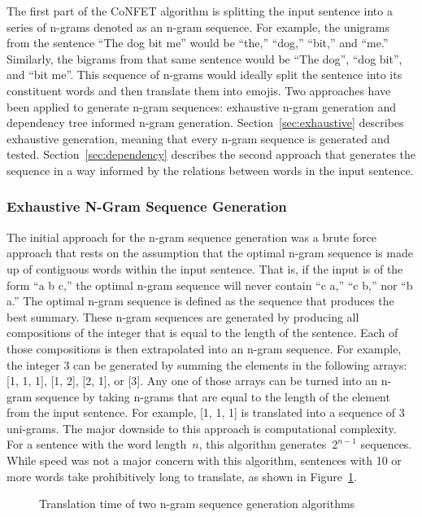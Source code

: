 \documentclass{article}[10]
\begin{document}
The first part of the CoNFET algorithm is splitting the input sentence into a series of n-grams denoted as an n-gram sequence. For example, the unigrams from the sentence ``The dog bit me'' would be ``the,'' ``dog,'' ``bit,'' and ``me.'' Similarly, the bigrams from that same sentence would be ``The dog'', ``dog bit'', and ``bit me''. This sequence of n-grams would ideally split the sentence into its constituent words and then translate them into emojis. Two approaches have been applied to generate n-gram sequences: exhaustive n-gram generation and dependency tree informed n-gram generation. Section~\ref{sec:exhaustive} describes exhaustive generation, meaning that every n-gram sequence is generated and tested. Section~\ref{sec:dependency} describes the second approach that generates the sequence in a way informed by the relations between words in the input sentence.

\subsubsection{Exhaustive N-Gram Sequence Generation\label{sec:exhaustive}}

The initial approach for the n-gram sequence generation was a brute force
approach that rests on the assumption that the optimal n-gram sequence is made
up of contiguous words within the input sentence. That is, if the input is of
the form ``a b c,'' the optimal n-gram sequence will never contain ``c a,'' ``c
b,'' nor ``b a.'' The optimal n-gram sequence is defined as the sequence that
produces the best summary. These n-gram sequences are generated by
producing all compositions of the integer that is equal to the length of the
sentence. Each of those compositions is then extrapolated into an n-gram
sequence. For example, the integer 3 can be generated by summing the elements in
the following arrays: [1, 1, 1], [1, 2], [2, 1], or [3]. Any one of those arrays
can be turned into an n-gram sequence by taking n-grams that are equal to the
length of the element from the input sentence. For example, [1, 1, 1] is
translated into a sequence of 3 uni-grams. The major downside to this approach
is computational complexity. For a sentence with the word length~\(n\), this
algorithm generates~\(2^{n-1}\) sequences. While speed was not a major concern
with this algorithm, sentences with 10 or more words take prohibitively long to
translate, as shown in Figure~\ref{fig:timing}.

\begin{figure}[h]
  \begin{center}
    \scalebox{0.6}{}
    \caption{Translation time of two n-gram sequence generation
      algorithms\label{fig:timing}}
  \end{center}
\end{figure}
\end{document}
